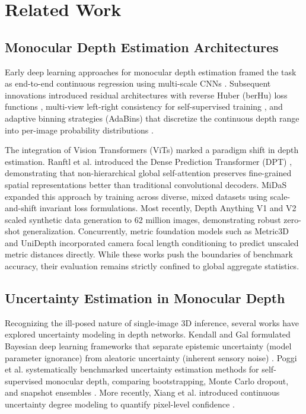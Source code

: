 \documentclass[11pt,a4paper]{article}
\begin{document}
\section{Related Work}
\label{sec:related}

\subsection{Monocular Depth Estimation Architectures}
Early deep learning approaches for monocular depth estimation framed the task as end-to-end continuous regression using multi-scale CNNs \citep{eigen2014depth}. Subsequent innovations introduced residual architectures with reverse Huber (berHu) loss functions \citep{laina2016deeper}, multi-view left-right consistency for self-supervised training \citep{godard2017unsupervised}, and adaptive binning strategies (AdaBins) that discretize the continuous depth range into per-image probability distributions \citep{bhat2021adabins}.

The integration of Vision Transformers (ViTs) marked a paradigm shift in depth estimation. Ranftl et al. introduced the Dense Prediction Transformer (DPT) \citep{ranftl2021vision}, demonstrating that non-hierarchical global self-attention preserves fine-grained spatial representations better than traditional convolutional decoders. MiDaS \citep{ranftl2022towards} expanded this approach by training across diverse, mixed datasets using scale-and-shift invariant loss formulations. Most recently, Depth Anything V1 and V2 \citep{yang2024depthanythingv1,yang2024depthanythingv2} scaled synthetic data generation to 62 million images, demonstrating robust zero-shot generalization. Concurrently, metric foundation models such as Metric3D \citep{yin2023metric3d} and UniDepth \citep{piccinelli2024unidepth} incorporated camera focal length conditioning to predict unscaled metric distances directly. While these works push the boundaries of benchmark accuracy, their evaluation remains strictly confined to global aggregate statistics.

\subsection{Uncertainty Estimation in Monocular Depth}
Recognizing the ill-posed nature of single-image 3D inference, several works have explored uncertainty modeling in depth networks. Kendall and Gal formulated Bayesian deep learning frameworks that separate epistemic uncertainty (model parameter ignorance) from aleatoric uncertainty (inherent sensory noise) \citep{kendall2017what}. Poggi et al. systematically benchmarked uncertainty estimation methods for self-supervised monocular depth, comparing bootstrapping, Monte Carlo dropout, and snapshot ensembles \citep{poggi2020uncertainty}. More recently, Xiang et al. introduced continuous uncertainty degree modeling to quantify pixel-level confidence \citep{xiang2023measuring}.
\end{document}
